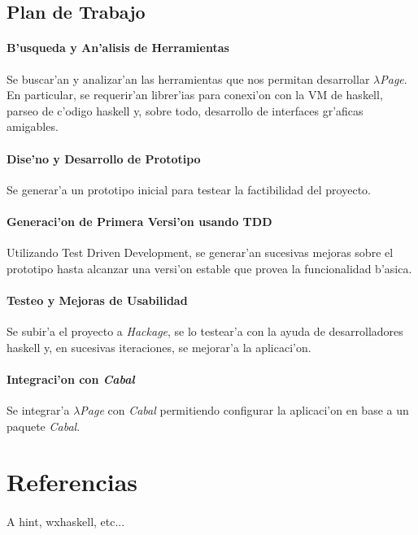 \documentclass[a4paper]{article}
\begin{document}
\subsection{Plan de Trabajo}
\paragraph{B'usqueda y An'alisis de Herramientas} Se buscar'an y analizar'an las herramientas que nos permitan desarrollar \textsl{$\lambda$Page}.  En particular, se requerir'an librer'ias para conexi'on con la VM de haskell, parseo de c'odigo haskell y, sobre todo, desarrollo de interfaces gr'aficas amigables.
\paragraph{Dise'no y Desarrollo de Prototipo} Se generar'a un prototipo inicial para testear la factibilidad del proyecto.
\paragraph{Generaci'on de Primera Versi'on usando TDD} Utilizando Test Driven Development, se generar'an sucesivas mejoras sobre el prototipo hasta alcanzar una versi'on estable que provea la funcionalidad b'asica.
\paragraph{Testeo y Mejoras de Usabilidad} Se subir'a el proyecto a \textsl{Hackage}, se lo testear'a con la ayuda de desarrolladores haskell y, en sucesivas iteraciones, se mejorar'a la aplicaci'on.
\paragraph{Integraci'on con \textsl{Cabal}} Se integrar'a \textsl{$\lambda$Page} con \textsl{Cabal} permitiendo configurar la aplicaci'on en base a un paquete \textsl{Cabal}.

\appendix
\section{Referencias}
\paragraph{} A hint, wxhaskell, etc...
\end{document}
